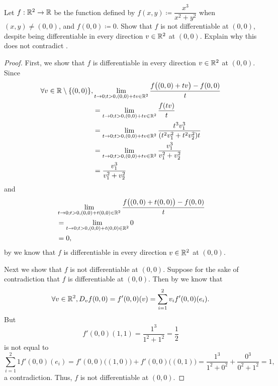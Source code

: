 \begin{ex}\label{ii:ex:6.3.3}
  Let \(f : \mathbb{R}^2 \to \mathbb{R}\) be the function defined by \(f(x, y) \coloneqq \dfrac{x^3}{x^2 + y^2}\) when \((x, y) \neq (0, 0)\), and \(f(0, 0) \coloneqq 0\).
  Show that \(f\) is not differentiable at \((0, 0)\), despite being differentiable in every direction \(v \in \mathbb{R}^2\) at \((0, 0)\).
  Explain why this does not contradict .
\end{ex}

\begin{proof}
  First, we show that \(f\) is differentiable in every direction \(v \in \mathbb{R}^2\) at \((0, 0)\).
  Since
  \begin{align*}
    \forall v \in \R \setminus \set{(0, 0)}, & \lim_{t \to 0 ; t > 0, (0, 0) + tv \in \R^2} \dfrac{f\big((0, 0) + tv\big) - f(0, 0)}{t}    \\
                                             & = \lim_{t \to 0 ; t > 0, (0, 0) + tv \in \R^2} \dfrac{f(tv)}{t}                             \\
                                             & = \lim_{t \to 0 ; t > 0, (0, 0) + tv \in \R^2} \dfrac{t^3 v_1^3}{(t^2 v_1^2 + t^2 v_2^2) t} \\
                                             & = \lim_{t \to 0 ; t > 0, (0, 0) + tv \in \R^2} \dfrac{v_1^3}{v_1^2 + v_2^2}                 \\
                                             & = \dfrac{v_1^3}{v_1^2 + v_2^2}
  \end{align*}
  and
  \begin{align*}
     & \lim_{t \to 0 ; t > 0, (0, 0) + t (0, 0) \in \mathbb{R}^2} \dfrac{f\big((0, 0) + t(0, 0)\big) - f(0, 0)}{t} \\
     & = \lim_{t \to 0 ; t > 0, (0, 0) + t (0, 0) \in \mathbb{R}^2} 0                                              \\
     & = 0,
  \end{align*}
  by  we know that \(f\) is differentiable in every direction \(v \in \mathbb{R}^2\) at \((0, 0)\).

  Next we show that \(f\) is not differentiable at \((0, 0)\).
  Suppose for the sake of contradiction that \(f\) is differentiable at \((0, 0)\).
  Then by  we know that
  \[
    \forall v \in \mathbb{R}^2, D_v f(0, 0) = f'(0, 0)(v) = \sum_{i = 1}^2 v_i f'(0, 0)(e_i).
  \]
  But
  \[
    f'(0, 0)(1, 1) = \dfrac{1^3}{1^2 + 1^2} = \dfrac{1}{2}
  \]
  is not equal to
  \[
    \sum_{i = 1}^2 1 f'(0, 0)(e_i) = f'(0, 0)\big((1, 0)\big) + f'(0, 0)\big((0, 1)\big) = \dfrac{1^3}{1^2 + 0^2} + \dfrac{0^3}{0^2 + 1^2} = 1,
  \]
  a contradiction.
  Thus, \(f\) is not differentiable at \((0, 0)\).


\end{proof}
